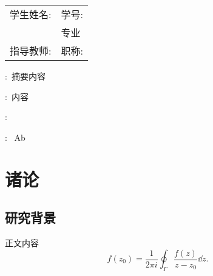 \documentclass[UTF8,heading=true,12pt]{article}
\author{NAME} %
\begin{document}
	\maketitle%
	\newpage
	\tableofcontents%
	\setcounter{page}{0}%
	\thispagestyle{empty}%
	\newpage
	\begin{center}
		\bfseries{\the\zhtitle}%
	\end{center}
	
	\begin{table}[H]
		\vspace{-1.5em}
		\centering
		\begin{spacing}{1.5}
			\begin{tabular}{rl} %
				学生姓名: {\the\author} & 学号: {\the\serialnumber}\\ 
				{\the\college} & {\the\major}专业\\
				指导教师: {\the\advisor} & 职称: {\the\advisors}\\	
			\end{tabular}
		\end{spacing}
		\vspace{-1.5em}
	\end{table}
	
	:{\kaishu{}\ 摘要内容} %
	
	
	:{\kaishu{}\ 内容}%
	
	\begin{center}
	\end{center}
	:\  \lipsum[1]
	
	:\  Ab
	
	\section{诸论}
	\subsection{研究背景}
	正文内容
	$$
	f(z_0)=\frac{1}{2\pi i}\oint_{\Gamma}\frac{f(z)}{z-z_0}\dd z.
	$$
	
\end{document}
